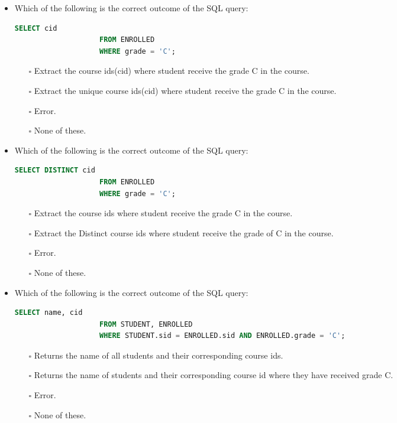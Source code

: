 \documentclass[10pt]{article}
\begin{document}
\begin{itemize}
			\item Which of the following is the correct outcome of the SQL query: 
				\begin{lstlisting}[language=SQL,firstline=1, lastline=3]
					SELECT cid 
					FROM ENROLLED 
					WHERE grade = 'C';
				\end{lstlisting}

				\begin{enumerate}
					\item[$\square$] Extract the course ids(cid) where student receive the grade C in the course.
					\item[$\square$] Extract the unique course ids(cid) where student receive the grade C in the course.
					\item[$\square$] Error.
					\item[$\square$] None of these.
				\end{enumerate}

			\item Which of the following is the correct outcome of the SQL query: 
				\begin{lstlisting}[language=SQL,firstline=1, lastline=3]
					SELECT DISTINCT cid 
					FROM ENROLLED 
					WHERE grade = 'C';
				\end{lstlisting}

				\begin{enumerate}
					\item[$\square$] Extract the course ids where student receive the grade C in the course.
					\item[$\square$] Extract the Distinct course ids where student receive the grade of C in the course.
					\item[$\square$] Error.
					\item[$\square$] None of these.
				\end{enumerate}
			
			\newpage

			\item Which of the following is the correct outcome of the SQL query: 
				\begin{lstlisting}[language=SQL,firstline=1, lastline=3]
					SELECT name, cid 
					FROM STUDENT, ENROLLED 
					WHERE STUDENT.sid = ENROLLED.sid AND ENROLLED.grade = 'C';
				\end{lstlisting}
			
				\begin{enumerate}
					\item[$\square$] Returns the name of all students and their corresponding course ids.
					\item[$\square$] Returns the name of students and their corresponding course id where they have received grade C.
					\item[$\square$] Error.
					\item[$\square$] None of these.
				\end{enumerate}


\end{itemize}
\end{document}
